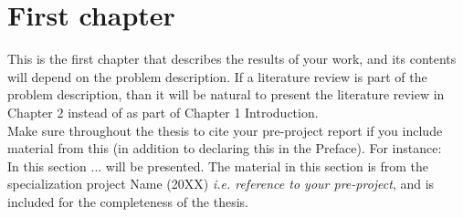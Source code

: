 \chapter{First chapter}\label{cha:first}
This is the first chapter that describes the results of your work, and its contents will depend on the problem description. If a literature review is part of the problem description, than it will be natural to present the literature review in Chapter 2 instead of as part of Chapter 1 Introduction.\\
Make sure throughout the thesis to cite your pre-project report if you include material from this (in addition to declaring this in the Preface). For instance:\\
In this section ... will be presented. The material in this section is from the specialization project Name (20XX) {\it i.e. reference to your pre-project}, and is included for the completeness of the thesis.